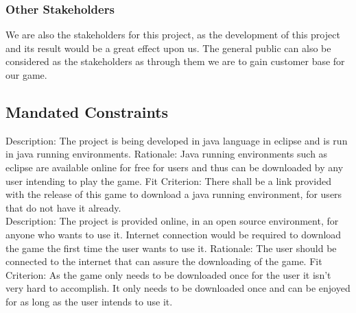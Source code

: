 \documentclass[12pt,letterpaper]{article}
\begin{document}
	\subsubsection{Other Stakeholders}
	We are also the stakeholders for this project, as the development of this project and its result would be a great effect upon us. The general public can also be considered as the stakeholders as through them we are to gain customer base for our game.
	
	\subsection{Mandated Constraints}
	Description: The project is being developed in java language in eclipse and is run in java running environments.
Rationale: Java running environments such as eclipse are available online for free for users and thus can be downloaded by any user intending to play the game.
Fit Criterion: There shall be a link provided with the release of this game to download a java running environment, for users that do not have it already.\\


\noindent Description: The project is provided online, in an open source environment, for anyone who wants to use it. Internet connection would be required to download the game the first time the user wants to use it.
Rationale: The user should be connected to the internet that can assure the downloading of the game.
Fit Criterion: As the game only needs to be downloaded once for the user it isn’t very hard to accomplish. It only needs to be downloaded once and can be enjoyed for as long as the user intends to use it.
	
\end{document}
